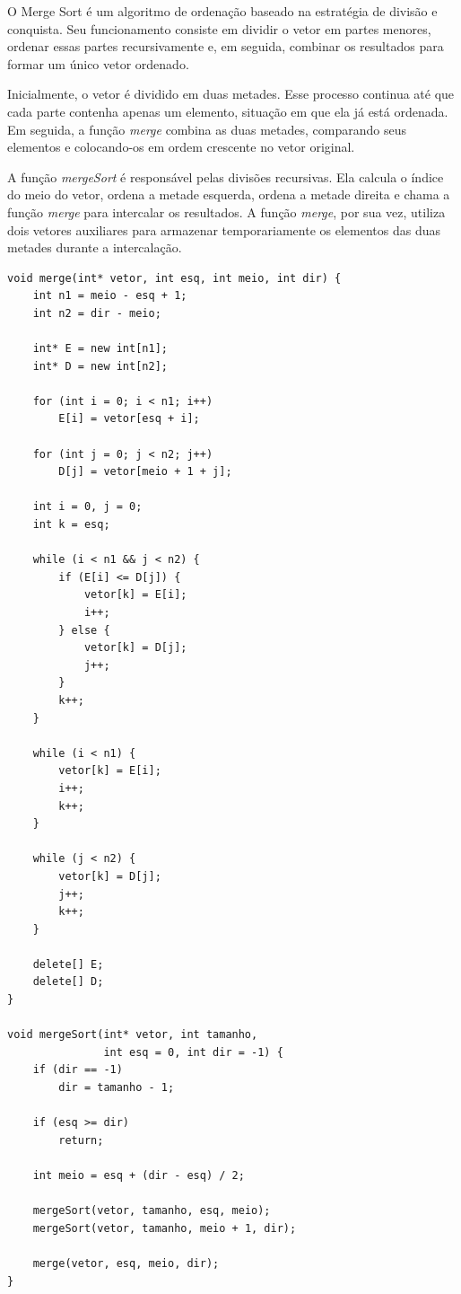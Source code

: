 \quad O Merge Sort é um algoritmo de ordenação baseado na estratégia
de divisão e conquista. Seu funcionamento consiste em dividir o vetor
em partes menores, ordenar essas partes recursivamente e, em seguida,
combinar os resultados para formar um único vetor ordenado.

\quad Inicialmente, o vetor é dividido em duas metades. Esse processo
continua até que cada parte contenha apenas um elemento, situação em
que ela já está ordenada. Em seguida, a função \textit{merge} combina
as duas metades, comparando seus elementos e colocando-os em ordem
crescente no vetor original.

\quad A função \textit{mergeSort} é responsável pelas divisões
recursivas. Ela calcula o índice do meio do vetor, ordena a metade
esquerda, ordena a metade direita e chama a função \textit{merge}
para intercalar os resultados. A função \textit{merge}, por sua vez,
utiliza dois vetores auxiliares para armazenar temporariamente os
elementos das duas metades durante a intercalação.

\begin{lstlisting}[caption={Implementação do Merge Sort}]
void merge(int* vetor, int esq, int meio, int dir) {
    int n1 = meio - esq + 1;
    int n2 = dir - meio;

    int* E = new int[n1];
    int* D = new int[n2];

    for (int i = 0; i < n1; i++)
        E[i] = vetor[esq + i];

    for (int j = 0; j < n2; j++)
        D[j] = vetor[meio + 1 + j];

    int i = 0, j = 0;
    int k = esq;

    while (i < n1 && j < n2) {
        if (E[i] <= D[j]) {
            vetor[k] = E[i];
            i++;
        } else {
            vetor[k] = D[j];
            j++;
        }
        k++;
    }

    while (i < n1) {
        vetor[k] = E[i];
        i++;
        k++;
    }

    while (j < n2) {
        vetor[k] = D[j];
        j++;
        k++;
    }

    delete[] E;
    delete[] D;
}

void mergeSort(int* vetor, int tamanho,
               int esq = 0, int dir = -1) {
    if (dir == -1)
        dir = tamanho - 1;

    if (esq >= dir)
        return;

    int meio = esq + (dir - esq) / 2;

    mergeSort(vetor, tamanho, esq, meio);
    mergeSort(vetor, tamanho, meio + 1, dir);

    merge(vetor, esq, meio, dir);
}
\end{lstlisting}

